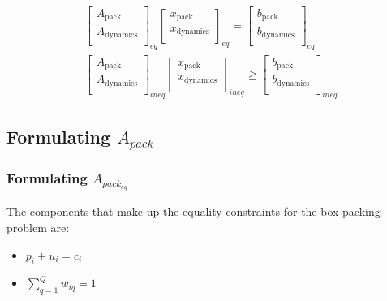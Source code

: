 \documentclass[conference]{IEEEtran}
\begin{document}
\begin{subequations}
\begin{align}
    \begin{bmatrix}
        A_{\textrm{pack}}     \\
        A_{\textrm{dynamics}} \\
    \end{bmatrix}_{eq}
    \begin{bmatrix}
        x_{\textrm{pack}}     \\
        x_{\textrm{dynamics}} \\
    \end{bmatrix}_{eq} =
    \begin{bmatrix}
        b_{\textrm{pack}}     \\
        b_{\textrm{dynamics}} \\
    \end{bmatrix}_{eq} \\
    \begin{bmatrix}
        A_{\textrm{pack}}     \\
        A_{\textrm{dynamics}} \\
    \end{bmatrix}_{ineq}
    \begin{bmatrix}
        x_{\textrm{pack}}     \\
        x_{\textrm{dynamics}} \\
    \end{bmatrix}_{ineq} \geq
    \begin{bmatrix}
        b_{\textrm{pack}}     \\
        b_{\textrm{dynamics}} \\
    \end{bmatrix}_{ineq}
\end{align}
\end{subequations}

\subsection{Formulating $A_{pack}$}

\subsubsection{Formulating $A_{pack_{eq}}$}

The components that make up the equality constraints for the box packing
problem are:

\begin{itemize}
\item
  \(p_i + u_i = c_i\)
\item
  \(\sum_{q=1}^Q w_{iq} = 1\)
\end{itemize}
\end{document}
